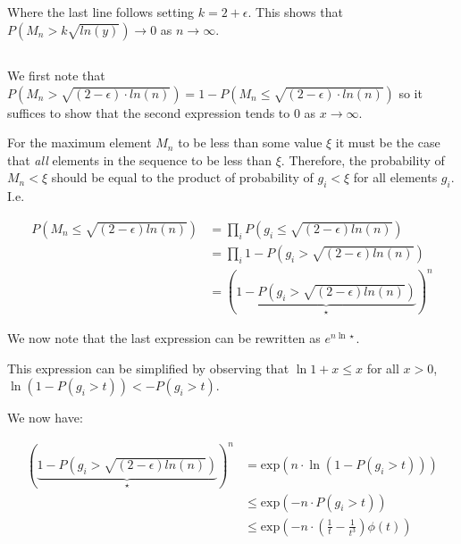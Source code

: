 \documentclass{article}
\begin{document}
Where the last line follows setting $k = 2+\epsilon$. This shows that $P \left( M_n > k\sqrt{ln(y)} \right)\rightarrow 0 $ as $n\rightarrow\infty$.

\subsection{}

We first note that $P \left( M_n > \sqrt{(2-\epsilon)\cdot ln(n)} \right) = 1 - P \left( M_n \leq\sqrt{(2-\epsilon)\cdot ln(n)}   \right)$ so it suffices to show that the second expression tends to 0 as $x\rightarrow\infty$.

For the maximum element $M_n$ to be less than some value $\xi$ it must be the case that \textit{all} elements in the sequence to be less than $\xi$. Therefore, the probability of $M_n<\xi$ should be equal to the product of probability of $g_i<\xi$ for all elements $g_i$. I.e. 

\begin{equation}
	\begin{split}
		P \left( M_n \leq \sqrt{(2-\epsilon)ln(n)} \right) &=\prod_i P \left( g_i\leq \sqrt{(2-\epsilon)ln(n)} \right)	 	 \\ 
								   &=\prod_i 1 - P \left( g_i>\sqrt{(2-\epsilon)ln(n)} \right)	\\
								   &=\left(\underbrace{1- P\left(  g_i > \sqrt{(2-\epsilon)ln(n)} \right)}_{\star}\right) ^ n
\end{split}
\end{equation}

We now note that the last expression can be rewritten as $e^{n\ln{\star}}$. 

This expression can be simplified by observing that $\ln{1+x}\leq x$ for all $x>0$, $\ln{\left( 1 - P \left( g_i>t \right) \right)}<-P \left( g_i >t \right)$. 

We now have: 


\begin{equation}
	\begin{split}
		\left(\underbrace{1- P\left(  g_i > \sqrt{(2-\epsilon)ln(n)} \right)}_{\star}\right) ^ n  &=
		\text{exp} \left( n \cdot \ln \left( 1 - P \left( g_i >t \right) \right) \right) \\
													  &\leq \text{exp} \left( -n \cdot P\left( g_i >t \right) \right) \\
													  &\leq 
		\text{exp} \left( -n \cdot \left( \frac{1}{t} - \frac{1}{t^3} \right) \phi(t) \right)
	\end{split}
\end{equation}
\end{document}

